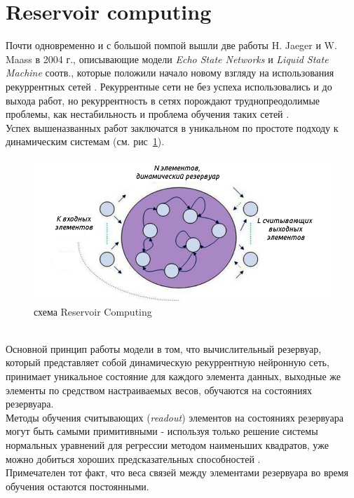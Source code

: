 \documentclass[a4paper,10pt]{article}
\begin{document}
\section{Reservoir computing}
\label{sec:res_comp_sec}
Почти одновременно и с большой помпой вышли две работы H. Jaeger \cite{esn} и W. Maass \cite{lsm} в 2004 г., описывающие модели \textit{Echo State Networks} и \textit{Liquid State Machine} соотв., которые положили начало новому взгляду на использования рекуррентных сетей . Рекуррентные сети не без успеха использовались и до выхода работ, но рекуррентность в сетях порождают труднопреодолимые проблемы, как нестабильность и проблема обучения таких сетей \cite{rnn_prob}.\\
\indent Успех вышеназванных работ заключатся в уникальном по простоте подходу к динамическим системам (см. рис~\ref{res_comp}).
\begin{figure}[ht]
\centering
\includegraphics[width=1\linewidth]{res_comp}
\caption{схема Reservoir Computing}
\label{res_comp}
\end{figure} \\
\indent Основной принцип работы модели в том, что вычислительный резервуар, который представляет собой динамическую рекуррентную нейронную сеть, принимает уникальное состояние для каждого элемента данных, выходные же элементы по средством настраиваемых весов, обучаются на состояниях резервуара.\\
\indent Методы обучения считывающих (\textit{readout}) элементов на состояниях резервуара могут быть самыми примитивными - используя только решение системы нормальных уравнений для регрессии методом наименьших квадратов, уже можно добиться хороших предсказательных способностей \cite{esn_site}.\\
\indent Примечателен тот факт, что веса связей между элементами резервуара во время обучения остаются постоянными.
\end{document}
